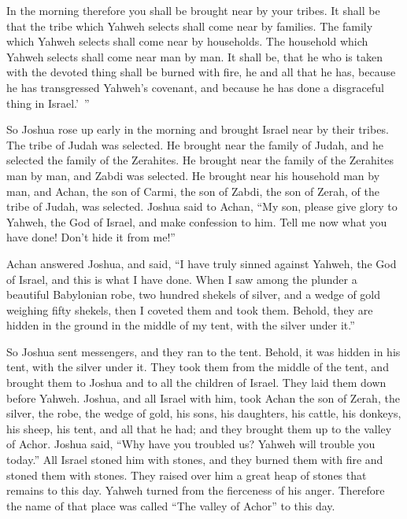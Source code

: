 {In the morning therefore you shall be brought near by your tribes. It shall be that the tribe which Yahweh selects shall come near by families. The family which Yahweh selects shall come near by households. The household which Yahweh selects shall come near man by man.
It shall be, that he who is taken with the devoted thing shall be burned with fire, he and all that he has, because he has transgressed Yahweh’s covenant, and because he has done a disgraceful thing in Israel.’ ”
\par }{\PP {}So Joshua rose up early in the morning and brought Israel near by their tribes. The tribe of Judah was selected.
He brought near the family of Judah, and he selected the family of the Zerahites. He brought near the family of the Zerahites man by man, and Zabdi was selected.
He brought near his household man by man, and Achan, the son of Carmi, the son of Zabdi, the son of Zerah, of the tribe of Judah, was selected.
Joshua said to Achan, “My son, please give glory to Yahweh, the God of Israel, and make confession to him. Tell me now what you have done! Don’t hide it from me!”
\par }{\PP {}Achan answered Joshua, and said, “I have truly sinned against Yahweh, the God of Israel, and this is what I have done.
When I saw among the plunder a beautiful Babylonian robe, two hundred shekels of silver, and a wedge of gold weighing fifty shekels, then I coveted them and took them. Behold, they are hidden in the ground in the middle of my tent, with the silver under it.”
\par }{\PP {}So Joshua sent messengers, and they ran to the tent. Behold, it was hidden in his tent, with the silver under it.
They took them from the middle of the tent, and brought them to Joshua and to all the children of Israel. They laid them down before Yahweh.
Joshua, and all Israel with him, took Achan the son of Zerah, the silver, the robe, the wedge of gold, his sons, his daughters, his cattle, his donkeys, his sheep, his tent, and all that he had; and they brought them up to the valley of Achor.
Joshua said, “Why have you troubled us? Yahweh will trouble you today.” All Israel stoned him with stones, and they burned them with fire and stoned them with stones.
They raised over him a great heap of stones that remains to this day. Yahweh turned from the fierceness of his anger. Therefore the name of that place was called “The valley of Achor” to this day.

}
